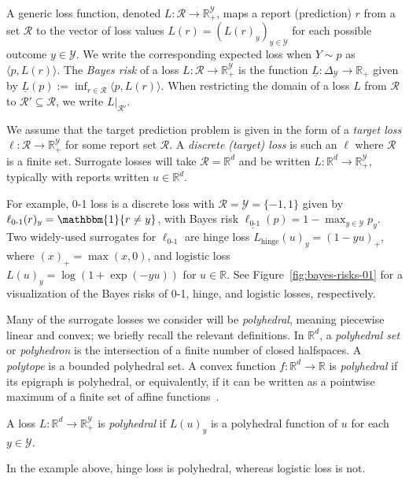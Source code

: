 \documentclass[twoside,11pt]{article}
\newcommand{\Comments}{1}
\newcommand{\mynote}[2]{\ifnum\Comments=1\textcolor{#1}{#2}\fi}
\newcommand{\jessie}[1]{\mynote{teal}{[JF: #1]}}
\newcommand{\reals}{\mathbb{R}}
\newcommand{\simplex}{\Delta_\Y}
\newcommand{\R}{\mathcal{R}}
\newcommand{\U}{\mathcal{U}}
\newcommand{\Y}{\mathcal{Y}}
\newcommand{\risk}[1]{\underline{#1}}
\newcommand{\inprod}[2]{\langle #1, #2 \rangle}%
\newcommand{\ones}{\mathbbm{1}}
\newcommand{\Ind}[1]{\ones\{#1\}}
\newcommand{\hinge}{L_{\mathrm{hinge}}}
\newcommand{\ellzo}{\ell_{\text{0-1}}}
\begin{document}
A generic loss function, denoted $L:\R\to\reals^\Y_+$, maps a report (prediction) $r$ from a set $\R$ to the vector of loss values $L(r) = (L(r)_y)_{y\in\Y}$ for each possible outcome $y\in\Y$.
We write the corresponding expected loss when $Y \sim p$ as $\inprod{p}{L(r)}$.
The \emph{Bayes risk} of a loss $L:\R\to\reals^\Y_+$ is the function $\risk{L}:\simplex\to\reals_+$ given by $\risk{L}(p) := \inf_{r\in\R} \inprod{p}{L(r)}$.
When restricting the domain of a loss $L$ from $\R$ to $\R' \subseteq \R$, we write $L|_{\R'}$.

We assume that the target prediction problem is given in the form of a \emph{target loss} $\ell:\R\to\reals^\Y_+$ for some report set $\R$.
A \emph{discrete (target) loss} is such an $\ell$ where $\R$ is a finite set.
Surrogate losses will take $\R = \reals^d$ and be written $L:\reals^d\to\reals^\Y_+$, typically with reports written $u\in\reals^d$.

For example, 0-1 loss is a discrete loss with $\R = \Y = \{-1,1\}$
given by $\ellzo(r)_y = \Ind{r \neq y}$, with Bayes risk $\risk{\ellzo}(p) = 1-\max_{y\in\Y} p_y$.
Two widely-used surrogates for $\ellzo$ are hinge loss $\hinge(u)_y = (1-yu)_+$, where $(x)_+ = \max(x,0)$, and logistic loss $L(u)_y = \log(1+\exp(-yu))$ for $u\in\reals$.
See Figure~\ref{fig:bayes-risks-01} for a visualization of the Bayes risks of 0-1, hinge, and logistic losses, respectively.

Many of the surrogate losses we consider will be \emph{polyhedral}, meaning piecewise linear and convex; we briefly recall the relevant definitions.
In $\reals^d$, a \emph{polyhedral set} or \emph{polyhedron} is the intersection of a finite number of closed halfspaces.
A \emph{polytope} is a bounded polyhedral set.
A convex function $f:\reals^d\to\reals$ is \emph{polyhedral} if its epigraph is polyhedral, or equivalently, if it can be written as a pointwise maximum of a finite set of affine functions~\citep{rockafellar1997convex}.
%
\begin{definition}
  A loss $L: \reals^d \to \reals^{\Y}_+$ is \emph{polyhedral} if $L(u)_y$ is a polyhedral function of $u$ for each $y\in\Y$.
\end{definition}
\noindent
In the example above, hinge loss is polyhedral, whereas logistic loss is not.
\end{document}
